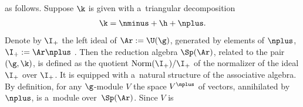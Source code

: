 as follows. Suppose $\k$ is given with  a~triangular decomposition
\begin{gather}
\label{intro1} \k=\nminus+\h+\nplus  .
\end{gather}
Denote by $\I_+$ the left ideal of $\Ar :=\U(\g)$, generated by elements of $\nplus$, $\I_+ :=\Ar\nplus$ . Then the reduction algebra $\Sp(\Ar)$, related to the pair
$(\g,\k)$, is def\/ined as the quotient $\mathrm{Norm}(\I_+)/\I_+$ of the normalizer of the ideal $\I_+$ over $\I_+$. It is equipped with a~natural structure of the
associative algebra.  By def\/inition, for any $\g$-module $V$ the space $V^\nplus$ of vectors, annihilated by $\nplus$, is a~module over~$\Sp(\Ar)$. Since $V$ is

